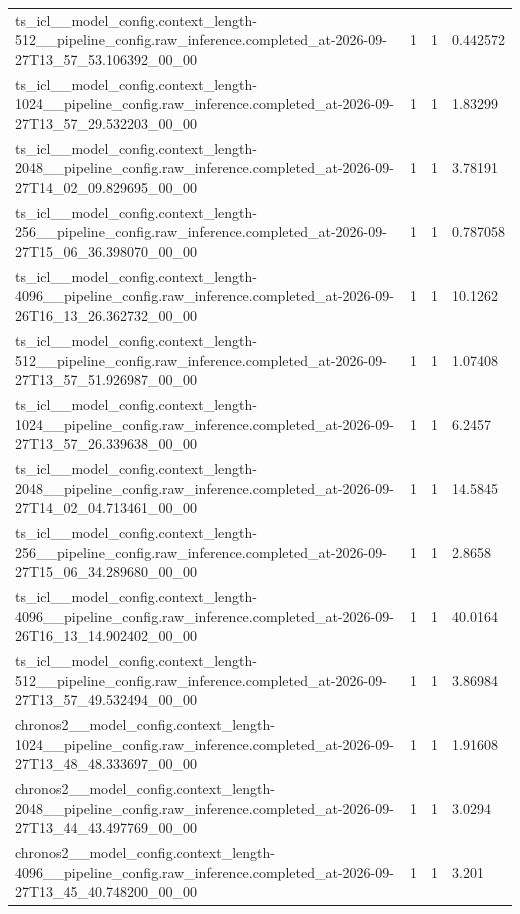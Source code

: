 \begin{tabular}{llll}
ts\_icl\_\_model\_config.context\_length-512\_\_pipeline\_config.raw\_inference.completed\_at-2026-09-27T13\_57\_53.106392\_00\_00 & 1 & 1 & 0.442572 \\
ts\_icl\_\_model\_config.context\_length-1024\_\_pipeline\_config.raw\_inference.completed\_at-2026-09-27T13\_57\_29.532203\_00\_00 & 1 & 1 & 1.83299 \\
ts\_icl\_\_model\_config.context\_length-2048\_\_pipeline\_config.raw\_inference.completed\_at-2026-09-27T14\_02\_09.829695\_00\_00 & 1 & 1 & 3.78191 \\
ts\_icl\_\_model\_config.context\_length-256\_\_pipeline\_config.raw\_inference.completed\_at-2026-09-27T15\_06\_36.398070\_00\_00 & 1 & 1 & 0.787058 \\
ts\_icl\_\_model\_config.context\_length-4096\_\_pipeline\_config.raw\_inference.completed\_at-2026-09-26T16\_13\_26.362732\_00\_00 & 1 & 1 & 10.1262 \\
ts\_icl\_\_model\_config.context\_length-512\_\_pipeline\_config.raw\_inference.completed\_at-2026-09-27T13\_57\_51.926987\_00\_00 & 1 & 1 & 1.07408 \\
ts\_icl\_\_model\_config.context\_length-1024\_\_pipeline\_config.raw\_inference.completed\_at-2026-09-27T13\_57\_26.339638\_00\_00 & 1 & 1 & 6.2457 \\
ts\_icl\_\_model\_config.context\_length-2048\_\_pipeline\_config.raw\_inference.completed\_at-2026-09-27T14\_02\_04.713461\_00\_00 & 1 & 1 & 14.5845 \\
ts\_icl\_\_model\_config.context\_length-256\_\_pipeline\_config.raw\_inference.completed\_at-2026-09-27T15\_06\_34.289680\_00\_00 & 1 & 1 & 2.8658 \\
ts\_icl\_\_model\_config.context\_length-4096\_\_pipeline\_config.raw\_inference.completed\_at-2026-09-26T16\_13\_14.902402\_00\_00 & 1 & 1 & 40.0164 \\
ts\_icl\_\_model\_config.context\_length-512\_\_pipeline\_config.raw\_inference.completed\_at-2026-09-27T13\_57\_49.532494\_00\_00 & 1 & 1 & 3.86984 \\
chronos2\_\_model\_config.context\_length-1024\_\_pipeline\_config.raw\_inference.completed\_at-2026-09-27T13\_48\_48.333697\_00\_00 & 1 & 1 & 1.91608 \\
chronos2\_\_model\_config.context\_length-2048\_\_pipeline\_config.raw\_inference.completed\_at-2026-09-27T13\_44\_43.497769\_00\_00 & 1 & 1 & 3.0294 \\
chronos2\_\_model\_config.context\_length-4096\_\_pipeline\_config.raw\_inference.completed\_at-2026-09-27T13\_45\_40.748200\_00\_00 & 1 & 1 & 3.201 \\

\end{tabular}
